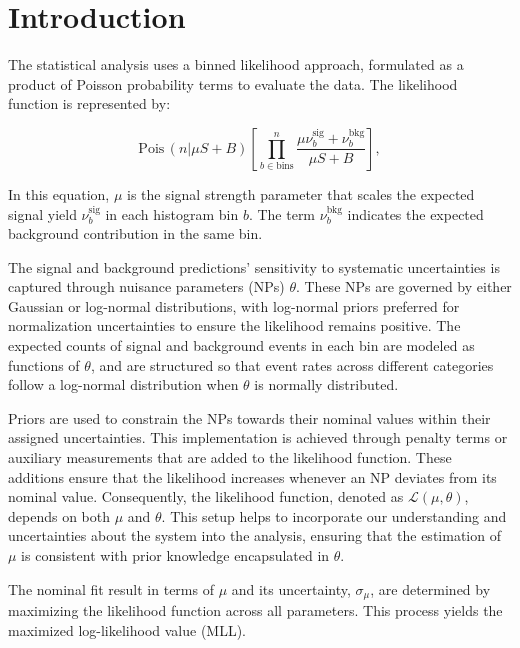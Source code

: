 \clearpage
\section{Introduction}

The statistical analysis uses a binned likelihood approach, formulated as a product of Poisson probability terms to evaluate the data. The likelihood function is represented by:

\begin{equation}
\mathrm{Pois}\,(n|\mu S+B)\left[ \prod_{b\in \text{bins}}^{n} \frac{\mu \nu^{\mathrm{sig}}_{b}+\nu^{\mathrm{bkg}}_{b}}{\mu S+B} \right],
\end{equation}

In this equation, $\mu$ is the signal strength parameter that scales the expected signal yield $\nu^{\mathrm{sig}}_b$ in each histogram bin $b$. 
The term $\nu^{\mathrm{bkg}}_b$ indicates the expected background contribution in the same bin.

The signal and background predictions' sensitivity to systematic uncertainties is captured through nuisance parameters (NPs) $\theta$. 
These NPs are governed by either Gaussian or log-normal distributions, with log-normal priors preferred for normalization uncertainties to ensure the likelihood remains positive. 
The expected counts of signal and background events in each bin are modeled as functions of $\theta$, 
and are structured so that event rates across different categories follow a log-normal distribution when $\theta$ is normally distributed.

Priors are used to constrain the NPs towards their nominal values within their assigned uncertainties. This implementation is achieved through penalty terms or auxiliary measurements that are added to the likelihood function. These additions ensure that the likelihood increases whenever an NP deviates from its nominal value. 
Consequently, the likelihood function, denoted as $\mathcal{L} (\mu,\theta)$, depends on both $\mu$ and $\theta$.
This setup helps to incorporate our understanding and uncertainties about the system into the analysis, ensuring that the estimation of $\mu$ is consistent with prior knowledge encapsulated in $\theta$.

The nominal fit result in terms of $\mu$ and its uncertainty, $\sigma_{\mu}$, are determined by maximizing the likelihood function across all parameters. 
This process yields the maximized log-likelihood value (MLL). 


